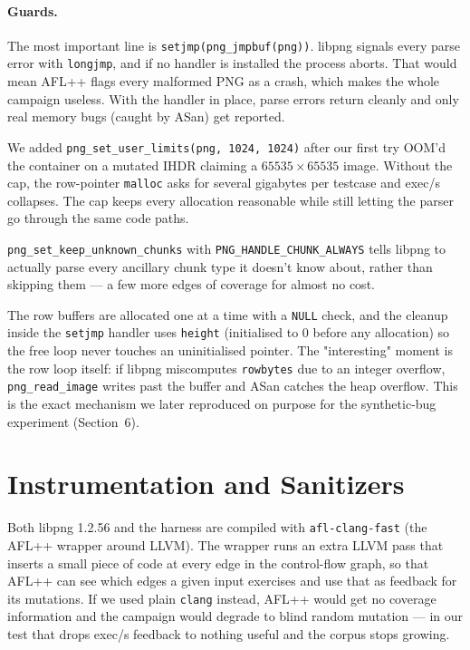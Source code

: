 \paragraph{Guards.}
The most important line is \verb|setjmp(png_jmpbuf(png))|. libpng
signals every parse error with \verb|longjmp|, and if no handler is
installed the process aborts. That would mean AFL++ flags every
malformed PNG as a crash, which makes the whole campaign useless.
With the handler in place, parse errors return cleanly and only real
memory bugs (caught by ASan) get reported.

We added \verb|png_set_user_limits(png, 1024, 1024)| after our first
try OOM'd the container on a mutated IHDR claiming a
$65535 \times 65535$ image. Without the cap, the row-pointer
\verb|malloc| asks for several gigabytes per testcase and exec/s
collapses. The cap keeps every allocation reasonable while still
letting the parser go through the same code paths.

\verb|png_set_keep_unknown_chunks| with \verb|PNG_HANDLE_CHUNK_ALWAYS|
tells libpng to actually parse every ancillary chunk type it doesn't
know about, rather than skipping them — a few more edges of coverage
for almost no cost.

The row buffers are allocated one at a time with a \verb|NULL| check,
and the cleanup inside the \verb|setjmp| handler uses \verb|height|
(initialised to 0 before any allocation) so the free loop never
touches an uninitialised pointer. The "interesting" moment is the row
loop itself: if libpng miscomputes \verb|rowbytes| due to an integer
overflow, \verb|png_read_image| writes past the buffer and ASan
catches the heap overflow. This is the exact mechanism we later
reproduced on purpose for the synthetic-bug experiment (Section~6).


\vspace{-12pt}
\section{Instrumentation and Sanitizers}
\vspace{-7pt}
Both libpng 1.2.56 and the harness are compiled with
\verb|afl-clang-fast| (the AFL++ wrapper around LLVM). The wrapper
runs an extra LLVM pass that inserts a small piece of code at every
edge in the control-flow graph, so that AFL++ can see which edges a
given input exercises and use that as feedback for its mutations.
If we used plain \verb|clang| instead, AFL++ would get no coverage
information and the campaign would degrade to blind random mutation
— in our test that drops exec/s feedback to nothing useful and the
corpus stops growing.

